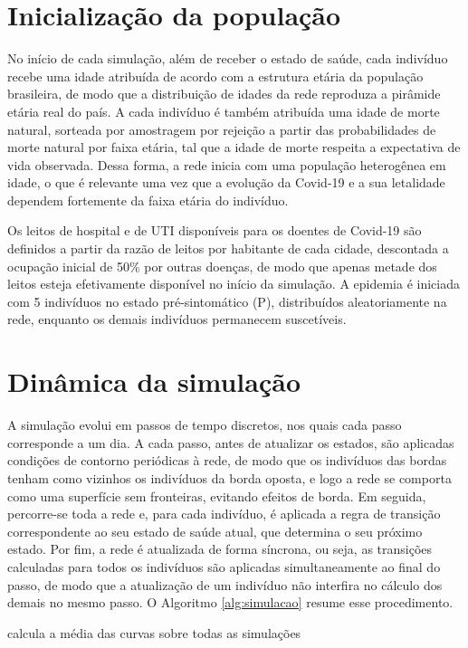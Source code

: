 \section{Inicialização da população}

No início de cada simulação, além de receber o estado de saúde, cada indivíduo recebe uma idade atribuída de acordo com a estrutura etária da população brasileira, de modo que a distribuição de idades da rede reproduza a pirâmide etária real do país. A cada indivíduo é também atribuída uma idade de morte natural, sorteada por amostragem por rejeição a partir das probabilidades de morte natural por faixa etária, tal que a idade de morte respeita a expectativa de vida observada. Dessa forma, a rede inicia com uma população heterogênea em idade, o que é relevante uma vez que a evolução da Covid-19 e a sua letalidade dependem fortemente da faixa etária do indivíduo.

Os leitos de hospital e de UTI disponíveis para os doentes de Covid-19 são definidos a partir da razão de leitos por habitante de cada cidade, descontada a ocupação inicial de 50\% por outras doenças, de modo que apenas metade dos leitos esteja efetivamente disponível no início da simulação. A epidemia é iniciada com 5 indivíduos no estado pré-sintomático (P), distribuídos aleatoriamente na rede, enquanto os demais indivíduos permanecem suscetíveis.

\section{Dinâmica da simulação}

A simulação evolui em passos de tempo discretos, nos quais cada passo corresponde a um dia. A cada passo, antes de atualizar os estados, são aplicadas condições de contorno periódicas à rede, de modo que os indivíduos das bordas tenham como vizinhos os indivíduos da borda oposta, e logo a rede se comporta como uma superfície sem fronteiras, evitando efeitos de borda. Em seguida, percorre-se toda a rede e, para cada indivíduo, é aplicada a regra de transição correspondente ao seu estado de saúde atual, que determina o seu próximo estado. Por fim, a rede é atualizada de forma síncrona, ou seja, as transições calculadas para todos os indivíduos são aplicadas simultaneamente ao final do passo, de modo que a atualização de um indivíduo não interfira no cálculo dos demais no mesmo passo. O Algoritmo \ref{alg:simulacao} resume esse procedimento.

\begin{algorithm}[H]
\DontPrintSemicolon
\caption{Laço principal da simulação}
\label{alg:simulacao}
calcula a média das curvas sobre todas as simulações\;
\end{algorithm}

